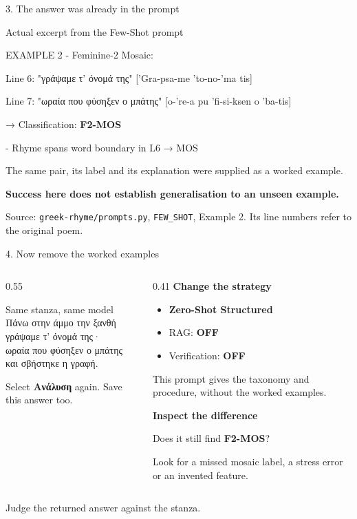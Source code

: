 \documentclass[aspectratio=169,10pt]{beamer}
\newcommand{\key}[1]{\textcolor{aegean}{\textbf{#1}}}
\newcommand{\hl}[1]{\textcolor{terracotta}{\textbf{#1}}}
\newcommand{\stanza}{%
Πάνω στην άμμο την ξανθή\\[4pt]
γράψαμε τ' όνομά της·\\[4pt]
ωραία που φύσηξεν ο μπάτης\\[4pt]
και σβήστηκε η γραφή.}
\begin{document}
\begin{frame}{3. The answer was already in the prompt}
  \setlength{\parskip}{0pt}
  \begin{block}{Actual excerpt from the Few-Shot prompt}
    \normalsize\ttfamily\raggedright\setlength{\parskip}{0pt}
    \vspace{3pt}
    EXAMPLE 2 - Feminine-2 Mosaic:\par\medskip
    Line 6: "γράψαμε τ' όνομά της" ['Gra-psa-me 'to-no-'ma tis]\par
    Line 7: "ωραία που φύσηξεν ο μπάτης" [o-'re-a pu 'fi-si-ksen o 'ba-tis]\par\medskip
    → Classification: \textcolor{aegean}{\textbf{F2-MOS}}\par\medskip
    [...]\par
    - Rhyme spans word boundary in L6 → MOS
  \end{block}
  \small The same pair, its label and its explanation were supplied as a worked example.\par
  \vspace{0.5em}
  \key{Success here does not establish generalisation to an unseen example.}\par
  \vfill
  \scriptsize Source: \texttt{greek-rhyme/prompts.py}, \texttt{FEW\_SHOT}, Example 2. Its line numbers refer to the original poem.
\end{frame}

\begin{frame}{4. Now remove the worked examples}
  \begin{columns}[T]
    \begin{column}{0.55\textwidth}
      \begin{block}{Same stanza, same model}
        \normalsize\stanza
      \end{block}
      \small Select \textbf{Ανάλυση} again. Save this answer too.
    \end{column}
    \begin{column}{0.41\textwidth}
      \textbf{Change the strategy}
      \begin{itemize}
        \item \key{Zero-Shot Structured}
        \item RAG: \hl{OFF}
        \item Verification: \hl{OFF}
      \end{itemize}
      \small This prompt gives the taxonomy and procedure, without the worked examples.\par
      \vspace{0.7em}
      \textbf{Inspect the difference}\par
      Does it still find \key{F2-MOS}?\par
      Look for a missed mosaic label, a stress error or an invented feature.
    \end{column}
  \end{columns}
  \vfill
  \small Judge the returned answer against the stanza.
\end{frame}
\end{document}
